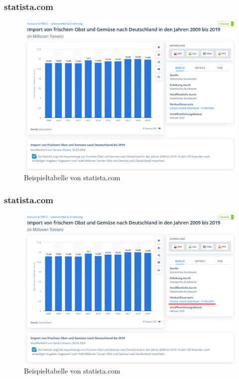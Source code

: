 \documentclass{beamer}
\begin{document}
\begin{frame}
	\frametitle{statista.com}
	\begin{figure}[h]
		\caption{Beispieltabelle von statista.com}
		\centering
		\includegraphics[scale=0.3]{5_Destatis_Report}
	\end{figure}
\end{frame}

\begin{frame}
	\frametitle{statista.com}
	\begin{figure}[h]
		\caption{Beispieltabelle von statista.com}
		\centering
		\includegraphics[scale=0.3]{5_Destatis_Report_highlightet}
	\end{figure}
\end{frame}  
\end{document}
